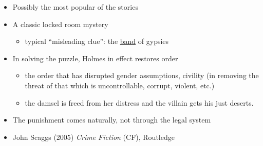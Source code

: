 \documentclass[a4paper,landscape,headrule,footrule,xetex]{foils}
\begin{document}
\begin{itemize}
\item Possibly the most popular of the stories
\item A classic locked room mystery
  \begin{itemize}
  \item typical  ``misleading clue'': the \ul{band} of gypsies
  \end{itemize}  \item In solving the puzzle, Holmes in effect restores order
    \begin{itemize}
    \item the order that has disrupted gender assumptions, civility (in removing
    the threat of that which is uncontrollable, corrupt, violent,
    etc.)
  \item the damsel is freed from her distress and the villain gets his just deserts. 
  \end{itemize}
\item The punishment comes naturally, not through the legal
  system

\end{itemize}
  \begin{itemize}
  \item   John Scaggs (2005) \textit{Crime Fiction} (CF), Routledge
  \end{itemize}
\end{document}
